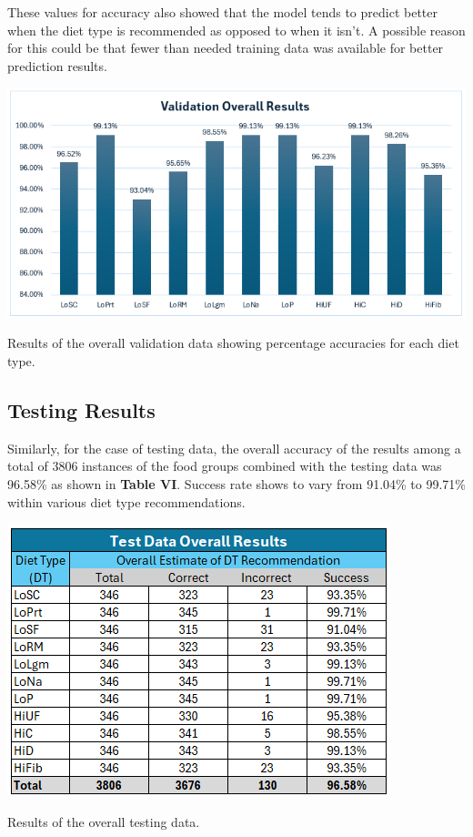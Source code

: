These values for accuracy also showed that the model tends to predict better when the diet type is recommended as opposed to when it isn't. A possible reason for this could be that fewer than needed training data was available for better prediction results.

\begin{table}[H]
    \centering
    \includegraphics[width=\linewidth]{Figures/barv.png}
    \caption{Results of the overall validation data showing percentage accuracies for each diet type.}
\end{table}

\subsection{Testing Results}
Similarly, for the case of testing data, the overall accuracy of the results among a total of 3806 instances of the food groups combined with the testing data was 96.58\% as shown in \textbf{Table VI}. Success rate shows to vary from 91.04\% to 99.71\% within various diet type recommendations.


\begin{table}[H]
    \centering
    \includegraphics[width=\linewidth]{Figures/tdor.png}
    \caption{Results of the overall testing data.}
\end{table}

